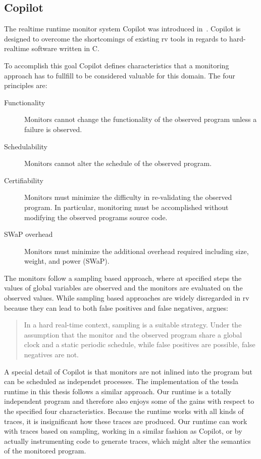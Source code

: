 \subsection{Copilot}
\label{sec:related:c_programs:copilot}

The realtime runtime monitor system Copilot was introduced in~\cite{Pike2010}.
Copilot is designed to overcome the shortcomings of existing \gls{rv} tools in regards to hard-realtime software written in C.

To accomplish this goal Copilot defines characteristics that a monitoring approach has to fullfill to be considered valuable for this domain.
The four principles are:

\begin{description}
  \item[Functionality] Monitors cannot change the functionality of the observed program unless a failure is observed.
  \item[Schedulability] Monitors cannot alter the schedule of the observed program.
  \item[Certifiability] Monitors must minimize the difficulty in re-validating the observed program. In particular, monitoring must be accomplished without modifying the observed programs source code.
  \item[SWaP overhead] Monitors must minimize the additional overhead required including size, weight, and power (SWaP).
\end{description}

The monitors follow a sampling based approach, where at specified steps the values of global variables are observed and the monitors are evaluated on the observed values.
While sampling based approaches are widely disregarded in \gls{rv} because they can lead to both false positives and false negatives, \cite{Pike2010} argues:

\begin{quote}
  In a hard real-time context, sampling is a suitable strategy.
  Under the assumption that the monitor and the observed program share a global clock and a static periodic schedule, while false positives are possible, false negatives are not.
\end{quote}

A special detail of Copilot is that monitors are not inlined into the program but can be scheduled as independet processes.
The implementation of the \gls{tessla} runtime in this thesis follows a similar approach.
Our runtime is a totally independent program and therefore also enjoys some of the gains with respect to the specified four characteristics.
Because the runtime works with all kinds of traces, it is insignificant how these traces are produced.
Our runtime can work with traces based on sampling, working in a similar fashion as Copilot, or by actually instrumenting code to generate traces, which might alter the semantics of the monitored program.

